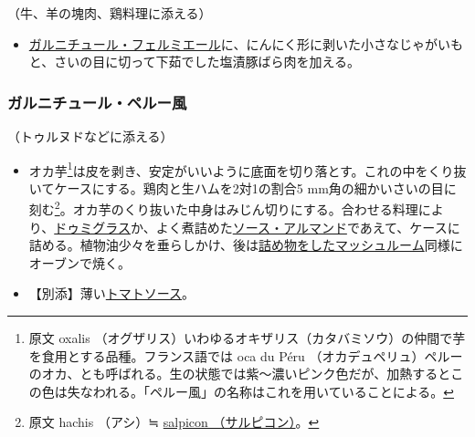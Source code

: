 \begin{recette}

（牛、羊の塊肉、鶏料理に添える）

\begin{itemize}
\tightlist
\item
  \protect\hyperlink{garniture-a-la-fermiere}{ガルニチュール・フェルミエール}に、にんにく形に剥いた小さなじゃがいもと、さいの目に切って下茹でした塩漬豚ばら肉を加える。
\end{itemize}

\atoaki{}

\hypertarget{garniture-a-la-peruvienne}{%
\subsubsection{ガルニチュール・ペルー風}\label{garniture-a-la-peruvienne}}



（トゥルヌドなどに添える）

\begin{itemize}
\item
  オカ芋\footnote{原文 oxalis
    （オグザリス）いわゆるオキザリス（カタバミソウ）の仲間で芋を食用とする品種。フランス語では
    oca du Péru
    （オカデュペリュ）ペルーのオカ、とも呼ばれる。生の状態では紫〜濃いピンク色だが、加熱するとこの色は失なわれる。「ペルー風」の名称はこれを用いていることによる。}は皮を剥き、安定がいいように底面を切り落とす。これの中をくり抜いてケースにする。鶏肉と生ハムを2対1の割合5
  mm角の細かいさいの目に刻む\footnote{原文 hachis （アシ）≒
    \protect\hyperlink{salpicons-divers}{salpicon （サルピコン）}。}。オカ芋のくり抜いた中身はみじん切りにする。合わせる料理により、\protect\hyperlink{sauce-demi-glace}{ドゥミグラス}か、よく煮詰めた\protect\hyperlink{sauce-allemande}{ソース・アルマンド}であえて、ケースに詰める。植物油少々を垂らしかけ、後は\protect\hyperlink{champignons-farcis}{詰め物をしたマッシュルーム}同様にオーブンで焼く。
\item
  【別添】薄い\protect\hyperlink{sauce-tomate}{トマトソース}。
\end{itemize}


\end{recette}
